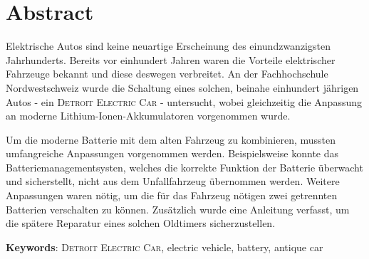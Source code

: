\chapter*{Abstract}
Elektrische Autos sind keine neuartige Erscheinung des einundzwanzigsten Jahrhunderts. Bereits vor einhundert Jahren waren die Vorteile elektrischer Fahrzeuge bekannt und diese deswegen verbreitet. An der Fachhochschule Nordwestschweiz wurde die Schaltung eines solchen, beinahe einhundert jährigen Autos - ein \textsc{Detroit Electric Car} - untersucht, wobei gleichzeitig die Anpassung an moderne Lithium-Ionen-Akkumulatoren vorgenommen wurde.

Um die moderne Batterie mit dem alten Fahrzeug zu kombinieren, mussten umfangreiche Anpassungen vorgenommen werden. Beispielsweise konnte das Batteriemanagementsysten, welches die korrekte Funktion der Batterie überwacht und sicherstellt, nicht aus dem Unfallfahrzeug übernommen werden. Weitere Anpassungen waren nötig, um die für das Fahrzeug nötigen zwei getrennten Batterien verschalten zu können.\color{blue} Zusätzlich wurde eine Anleitung verfasst, um die spätere Reparatur eines solchen Oldtimers sicherzustellen.
\color{black}

\textbf{Keywords}: \textsc{Detroit Electric Car}, electric vehicle, battery, antique car